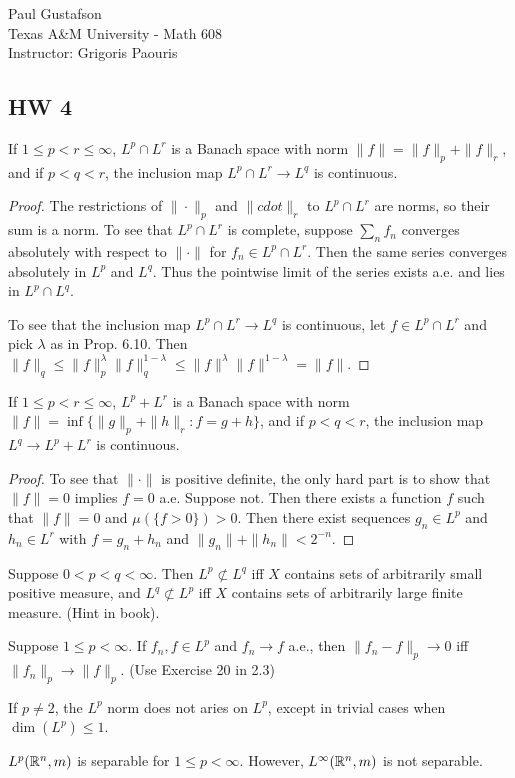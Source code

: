 \documentclass{article}
\begin{document}
\noindent Paul Gustafson\\
\noindent Texas A\&M University - Math 608 \\ 
\noindent Instructor: Grigoris Paouris

\subsection*{HW 4}
 If $1 \le p < r \le \infty$, $L^p \cap L^r$ is a Banach space with norm $\|f\| = \|f\|_p + \|f\|_r$, and if 
$p < q< r$, the inclusion map $L^p \cap L^r \to L^q$ is continuous.
\begin{proof}
The restrictions of $\|\cdot\|_p$ and $\|cdot\|_r$ to $L^p \cap L^r$ are norms, so their sum is a norm.  To see that $L^p \cap L^r$ is complete, suppose $\sum_n f_n$ converges absolutely with respect to $\| \cdot \|$ for $f_n \in L^p \cap L^r$.  Then the same series converges absolutely in $L^p$ and $L^q$.  Thus the pointwise limit of the series exists a.e. and lies in $L^p \cap L^q$.

To see that the inclusion map $L^p \cap L^r \to L^q$ is continuous, let $f \in L^p \cap L^r$ and pick $\lambda$ as in Prop. 6.10.  Then $\|f\|_q \le \|f\|_p^\lambda \|f\|_q^{1 - \lambda} \le \|f\|^\lambda \|f\|^{1 - \lambda} = \|f\|$.
\end{proof}

 If $1 \le p < r \le \infty$, $L^p + L^r$ is a Banach space with norm $\|f\| = \inf\{\|g\|_p + \|h\|_r : f = g + h\}$, and if
$p < q < r$, the inclusion map $L^q \to L^p + L^r$ is continuous.

\begin{proof}
To see that $\|\cdot\|$ is positive definite, the only hard part is to show that $\|f\| = 0$ implies $f = 0$ a.e.  Suppose not. Then there exists a function $f$ such that $\|f\| = 0$ and $\mu(\{f > 0\}) > 0$.  Then there exist sequences $g_n \in L^p$ and $h_n \in L^r$ with $f = g_n + h_n$ and $\|g_n\| + \|h_n\| < 2^{-n}$. 
\end{proof}


 Suppose $0 < p < q < \infty$. Then $L^p \not\subset L^q$ iff $X$ contains sets of arbitrarily small positive measure, and $L^q \not \subset L^p$ iff $X$ contains sets of arbitrarily large finite measure. (Hint in book).

 Suppose $1 \le p < \infty$. If $f_n, f \in L^p$ and $f_n \to f$ a.e., then $\|f_n - f\|_p \to 0$ iff $\|f_n\|_p \to \|f\|_p$. (Use Exercise 20 in 2.3)

 If $p \neq 2$, the $L^p$ norm does not aries on $L^p$, except in trivial cases when $\dim(L^p) \le 1$.

 $L^p(\mathbb{R}^n, m)$ is separable for $1 \le p < \infty$. However, $L^\infty(\mathbb{R}^n, m)$ is not separable.
\end{document}
